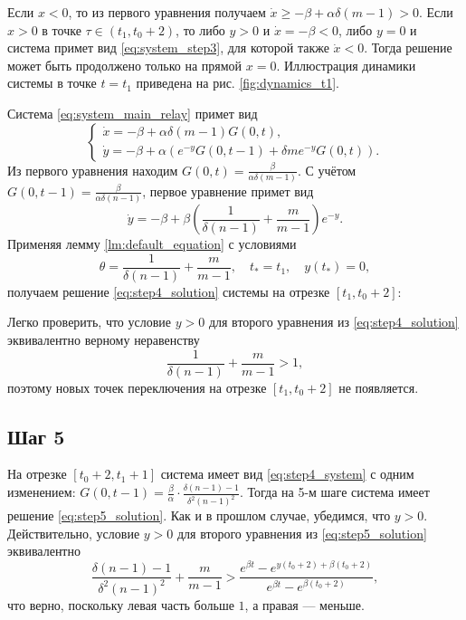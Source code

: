 Если $x < 0$, то из первого уравнения получаем $\dot{x} \geqslant -\beta + \alpha \delta (m - 1) > 0$. Если $x > 0$ в точке $\tau \in (t_1, t_0 + 2)$, то либо $y > 0$ и $\dot{x} = -\beta < 0$, либо $y = 0$ и система примет вид \eqref{eq:system_step3}, для которой также $\dot{x} < 0$. Тогда решение может быть продолжено только на прямой $x = 0$. Иллюстрация динамики системы в точке $t=t_1$ приведена на рис. \ref{fig:dynamics_t1}.

Система \eqref{eq:system_main_relay} примет вид
%
\begin{equation}
	\label{eq:step4_system}
	\begin{cases}
		\dot{x} = -\beta + \alpha \delta (m - 1) G(0, t),\\
		\dot{y} = -\beta + \alpha \left(e^{-y} G(0, t - 1) + \delta m e^{-y} G(0, t)\right).
	\end{cases}
\end{equation}
%
Из первого уравнения находим $G(0, t) = \frac{\beta}{\alpha \delta (m - 1)}$. С учётом $G(0, t - 1) = \frac{\beta}{\alpha \delta (n - 1)}$, первое уравнение примет вид
\[
\dot{y} = -\beta + \beta \left(\dfrac{1}{\delta(n - 1)} + \dfrac{m}{m - 1} \right) e^{-y}.
\]
%
Применяя лемму \ref{lm:default_equation} с условиями
\[
\theta = \dfrac{1}{\delta(n - 1)} + \dfrac{m}{m - 1}, \quad t_* = t_1, \quad y(t_*) = 0,
\]
получаем решение \eqref{eq:step4_solution} системы на отрезке $[t_1, t_0 + 2]$:

Легко проверить, что условие $y > 0$ для второго уравнения из \eqref{eq:step4_solution} эквивалентно верному неравенству
\[
\dfrac{1}{\delta(n - 1)} + \dfrac{m}{m - 1} > 1,
\]
поэтому новых точек переключения на отрезке $[t_1, t_0 + 2]$ не появляется.

\subsection{Шаг 5}
На отрезке $[t_0 + 2, t_1 + 1]$ система имеет вид \eqref{eq:step4_system} с одним изменением: $G(0, t - 1) = \frac{\beta}{\alpha} \cdot \frac{\delta(n - 1) - 1}{\delta^2 (n - 1)^2}$.
%
Тогда на 5-м шаге система имеет решение \eqref{eq:step5_solution}.
%
Как и в прошлом случае, убедимся, что $y > 0$. Действительно, условие $y > 0$ для второго уравнения из \eqref{eq:step5_solution} эквивалентно
\[
\frac{\delta(n - 1) - 1}{\delta^2 (n - 1)^2} + \dfrac{m}{m - 1} > \dfrac{e^{\beta t} - e^{y(t_0 + 2) + \beta (t_0 + 2)}}{e^{\beta t} - e^{\beta (t_0 + 2)}},
\]
что верно, поскольку левая часть больше $1$, а правая --- меньше.

